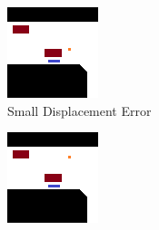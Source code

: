 \begin{figure}[h]
	\begin{subfigure}[t]{0.25\linewidth}
		\includegraphics[width=\linewidth]{Figures/Res_Prop/small_disp_colloquium}
		\caption{Small Displacement Error}
		\label{fig:met_crit_sdisp}
	\end{subfigure} \hfil
	\begin{subfigure}[t]{0.25\linewidth}
		\includegraphics[width=\linewidth]{Figures/Res_Prop/big_disp_colloquium}

\end{subfigure}
\end{figure}
